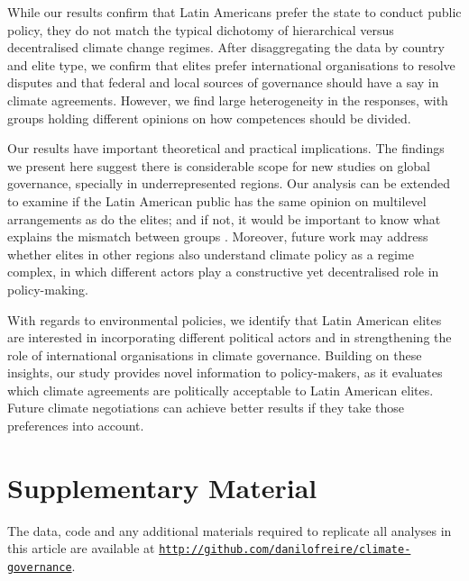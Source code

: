 \documentclass[a4paper,12pt]{article}
\begin{document}
While our results confirm that Latin Americans prefer the state to conduct public policy, they do not match the typical dichotomy of hierarchical versus decentralised climate change regimes. After disaggregating the data by country and elite type, we confirm that elites prefer international organisations to resolve disputes and that federal and local sources of governance should have a say in climate agreements. However, we find large heterogeneity in the responses, with groups holding different opinions on how competences should be divided. 

Our results have important theoretical and practical implications. The findings we present here suggest there is considerable scope for new studies on global governance, specially in underrepresented regions. Our analysis can be extended to examine if the Latin American public has the same opinion on multilevel arrangements as do the elites; and if not, it would be important to know what explains the mismatch between groups \citep{luna2005political}. Moreover, future work may address whether elites in other regions also understand climate policy as a regime complex, in which different actors play a constructive yet decentralised role in policy-making. 

With regards to environmental policies, we identify that Latin American elites are interested in incorporating different political actors and in strengthening the role of international organisations in climate governance. Building on these insights, our study provides novel information to policy-makers, as it evaluates which climate agreements are politically acceptable to Latin American elites. Future climate negotiations can achieve better results if they take those preferences into account.

\section*{Supplementary Material}
\label{sec:supplementary}

The data, code and any additional materials required to replicate all analyses in this article are available at \href{http://github.com/danilofreire/climate-governance}{\texttt{http://github.com/danilofreire/climate-governance}}.



\end{document}
